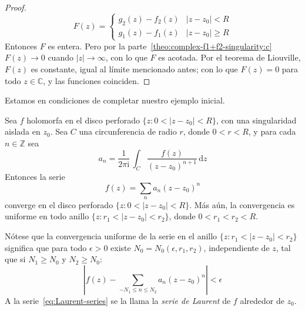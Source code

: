 \begin{proof}
\begin{equation*}
      F(z)
	= \begin{cases}
	    g_2(z) - f_2(z) & \lvert z - z_0 \rvert < R \\
	    g_1(z) - f_1(z) & \lvert z - z_0 \rvert \ge R
	  \end{cases}
    \end{equation*}
    Entonces \(F\) es entera.
    Pero por la parte~\ref{theo:complex-f1+f2-singularity:c}
    \(F(z) \rightarrow 0\)
    cuando \(\lvert z \rvert \rightarrow \infty\),
    con lo que \(F\) es acotada.
    Por el teorema de Liouville,%
    \(F(z)\) es constante,
    igual al límite mencionado antes;
    con lo que \(F(z) = 0\) para todo \(z \in \mathbb{C}\),
    y las funciones coinciden.
  \end{proof}
  Estamos en condiciones de completar nuestro ejemplo inicial.
  \begin{theorem}
    \label{theo:Laurent-series}
    Sea \(f\) holomorfa en el disco perforado
    \(\{ z \colon 0 < \lvert z - z_0 \rvert < R \}\),
    con una singularidad aislada en \(z_0\).
    Sea \(C\) una circunferencia de radio \(r\),
    donde \(0 < r < R\),
    y para cada \(n \in \mathbb{Z}\) sea
    \begin{equation}
      \label{eq:Laurent-series-coefficient}
      a_n
	= \frac{1}{2 \pi \mathrm{i}} \,
	    \int_C \frac{f(z)}{(z - z_0)^{n + 1}} \, \mathrm{d} z
    \end{equation}
    Entonces la serie
    \begin{equation}
      \label{eq:Laurent-series}
      f(z)
	= \sum_n a_n (z - z_0)^n
    \end{equation}
    converge en el disco perforado
      \(\{ z \colon 0 < \lvert z - z_0 \rvert < R \}\).
    Más aún,
    la convergencia es uniforme en todo anillo
      \(\{ z \colon r_1 < \lvert z - z_0 \rvert < r_2 \}\),
    donde \(0 < r_1 < r_2 < R\).
  \end{theorem}
  Nótese que la convergencia uniforme de la serie en el anillo
    \(\{ z \colon r_1 < \lvert z - z_0 \rvert < r_2 \}\)
  significa que para todo \(\epsilon > 0\)
  existe \(N_0 = N_0(\epsilon, r_1, r_2)\),
  independiente de \(z\),
  tal que si \(N_1 \ge N_0\) y \(N_2 \ge N_0\):
  \begin{equation*}
    \left\lvert
      f(z)
	- \sum_{-N_1 \le n \le N_2} a_n (z - z_0)^n
    \right\rvert
      < \epsilon
  \end{equation*}
  A la serie~\eqref{eq:Laurent-series} se la llama
  la \emph{serie de Laurent} de \(f\) alrededor de \(z_0\).%
